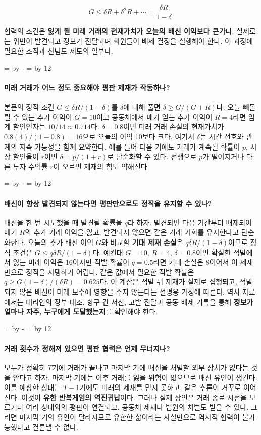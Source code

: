 \documentclass[10pt,a4paper]{article}
\newcommand{\ReserveQuestionSpace}{%
  \par\begingroup
  \dimen0=\pagegoal \advance\dimen0 by -\pagetotal
  \dimen2=\baselineskip \multiply\dimen2 by 12
  \ifdim\dimen0<\dimen2 \newpage\fi
  \endgroup}
\begin{document}
\[
G\leq \delta R+\delta^2R+\cdots=\frac{\delta R}{1-\delta}.
\]

협력의 조건은 \textbf{잃게 될 미래 거래의 현재가치가 오늘의 배신 이익보다 큰가}다. 실제로는 위반이 발견되고 정보가 전달되며 회원들이 배제 결정을 실행해야 한다. 이 과정에 필요한 조직과 신념도 제도의 일부다.\par

\ReserveQuestionSpace
\paragraph{미래 거래가 어느 정도 중요해야 평판 제재가 작동하나?}
본문의 정직 조건 $G\leq\delta R/(1-\delta)$를 $\delta$에 대해 풀면 $\delta\geq G/(G+R)$다. 오늘 빼돌릴 수 있는 추가 이익이 $G=10$이고 공동체에서 매기 얻는 추가 이익이 $R=4$라면 임계 할인인자는 $10/14\approx0.714$다. $\delta=0.8$이면 미래 거래 손실의 현재가치가 $0.8(4)/(1-0.8)=16$으로 오늘의 이익 10보다 크다. 여기서 $\delta$는 시간 선호와 관계의 지속 가능성을 함께 요약한다. 예를 들어 다음 기에도 거래가 계속될 확률이 $p$, 시장 할인율이 $r$이면 $\delta=p/(1+r)$로 단순화할 수 있다. 전쟁으로 $p$가 떨어지거나 다른 투자 수익률 $r$이 오르면 제재의 힘도 약해진다.\par

\ReserveQuestionSpace
\paragraph{배신이 항상 발견되지 않는다면 평판만으로도 정직을 유지할 수 있나?}
배신을 한 번 시도했을 때 발견될 확률을 $q$라 하자. 발견되면 다음 기간부터 배제되어 매기 $R$의 추가 거래 이익을 잃고, 발견되지 않으면 같은 거래 기회를 유지한다고 단순화한다. 오늘의 추가 배신 이익 $G$와 비교할 \textbf{기대 제재 손실}은 $q\delta R/(1-\delta)$이므로 정직 조건은 $G\leq q\delta R/(1-\delta)$다. 예컨대 $G=10$, $R=4$, $\delta=0.8$이면 확실한 적발에서 잃는 미래 이익은 16이지만 적발 확률이 $q=0.5$라면 기대 손실은 8이어서 이 제재만으로 정직을 지탱하기 어렵다. 같은 값에서 필요한 적발 확률은 $q\geq G(1-\delta)/(\delta R)=0.625$다. 이 계산은 적발 뒤 제재가 실제로 집행되고, 적발되지 않은 배신이 미래 보수에 영향을 주지 않는다는 설명용 가정에 따른다. 역사 자료에서는 대리인의 장부 대조, 항구 간 서신, 고발 전달과 공동 배제 기록을 통해 \textbf{정보가 얼마나 자주, 누구에게 도달했는지}를 확인해야 한다.\par

\ReserveQuestionSpace
\paragraph{거래 횟수가 정해져 있으면 평판 협력은 언제 무너지나?}
모두가 정확히 $T$기에 거래가 끝나고 마지막 기에 배신을 처벌할 외부 장치가 없다는 것을 안다고 하자. 마지막 기에는 이후 거래를 잃을 위험이 없으므로 배신 유인이 생긴다. 이를 예상한 상대는 $T-1$기에도 미래의 제재를 믿지 못하고, 같은 추론이 거꾸로 이어진다. 이것이 \textbf{유한 반복게임의 역진귀납}이다. 그러나 실제 상인은 거래 종료 시점을 모르거나 여러 상대와의 평판이 연결되고, 공동체 제재나 법원의 처벌도 받을 수 있다. 그러면 마지막 기의 유인이 달라지므로 유한한 삶이라는 사실만으로 역사적 협력이 불가능했다고 결론낼 수 없다.\par
\end{document}

